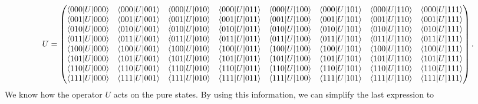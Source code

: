 \documentclass[10pt]{article}
\begin{document}
\begin{equation}
U=
  \begin{pmatrix}
    \braket{000|U|000} & \braket{000|U|001} & \braket{000|U|010} & \braket{000|U|011} & \braket{000|U|100} & \braket{000|U|101} & \braket{000|U|110} & \braket{000|U|111}\\
    \braket{001|U|000} & \braket{001|U|001} & \braket{001|U|010} & \braket{001|U|011} & \braket{001|U|100} & \braket{001|U|101} & \braket{001|U|110} & \braket{001|U|111}\\
    \braket{010|U|000} & \braket{010|U|001} & \braket{010|U|010} & \braket{010|U|011} & \braket{010|U|100} & \braket{010|U|101} & \braket{010|U|110} & \braket{010|U|111}\\
    \braket{011|U|000} & \braket{011|U|001} & \braket{011|U|010} & \braket{011|U|011} & \braket{011|U|100} & \braket{011|U|101} & \braket{011|U|110} & \braket{011|U|111}\\
    \braket{100|U|000} & \braket{100|U|001} & \braket{100|U|010} & \braket{100|U|011} & \braket{100|U|100} & \braket{100|U|101} & \braket{100|U|110} & \braket{100|U|111}\\
    \braket{101|U|000} & \braket{101|U|001} & \braket{101|U|010} & \braket{101|U|011} & \braket{101|U|100} & \braket{101|U|101} & \braket{101|U|110} & \braket{101|U|111}\\
    \braket{110|U|000} & \braket{110|U|001} & \braket{110|U|010} & \braket{110|U|011} & \braket{110|U|100} & \braket{110|U|101} & \braket{110|U|110} & \braket{110|U|111}\\
    \braket{111|U|000} & \braket{111|U|001} & \braket{111|U|010} & \braket{111|U|011} & \braket{111|U|100} & \braket{111|U|101} & \braket{111|U|110} & \braket{111|U|111}
  \end{pmatrix}.
\end{equation}
We know how the operator \(U\) acts on the pure states. By using this
information, we can simplify the last expression to
\end{document}
